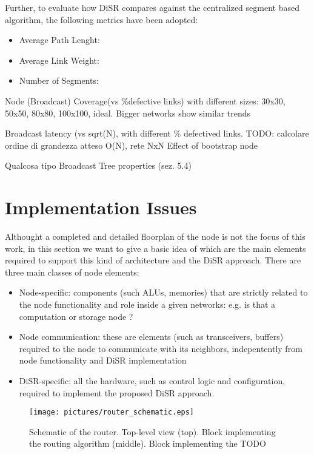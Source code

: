 \documentclass[final,journal,letterpaper]{IEEEtran}
\begin{document}
\begin{itemize}
Further, to evaluate how DiSR compares against the centralized segment
based algorithm, the following metrics have been adopted:
\begin{itemize}
\item {Average Path Lenght}:
\item {Average Link Weight}:
\item {Number of Segments}:
\end{itemize}

Node (Broadcast) Coverage(vs \%defective links) with different sizes:
30x30, 50x50, 80x80, 100x100, ideal. Bigger networks show similar
trends 

Broadcast latency (vs sqrt(N), with different \% defectived
links. TODO: calcolare ordine di grandezza atteso O(N), rete NxN
Effect of bootstrap node 

Qualcosa tipo Broadcast Tree properties (sez.  5.4)


\section{Implementation Issues}
\label{sec:implementation}
Althought a completed and detailed floorplan of the node is not the
focus of this work, in this section we want to give a basic idea of
which are the main elements required to support this kind of
architecture and the DiSR approach. There are three main classes of
node elements:
\begin{itemize}
\item Node-specific: components (such ALUs, memories) that are
strictly related to the node functionality and role inside a given
networks: e.g. is that a computation or storage node ?
\item Node communication:  these are elements (such as transceivers,
buffers) required to the node to communicate with its neighbors,
indepentently from node functionality and DiSR implementation
\item DiSR-specific: all the hardware, such as control logic and
configuration, required to implement the proposed DiSR approach.
\end{itemize}

\begin{figure}
  \centering
  \texttt{[image: pictures/router\_schematic.eps]}
  \caption{Schematic of the router. Top-level view (top). Block
  implementing the routing algorithm (middle). Block implementing the
  TODO
  }
  \label{fig:schematic}
\end{figure}


\end{itemize}
\end{document}
